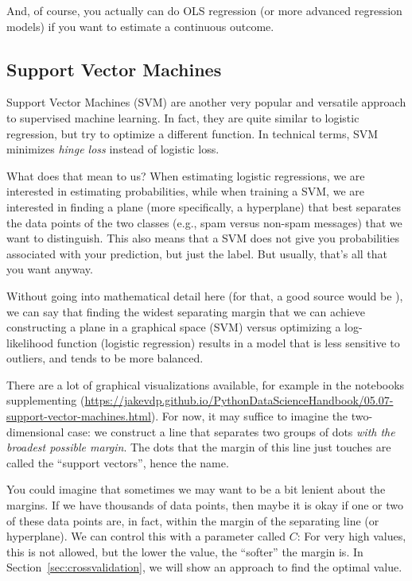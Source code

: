 And, of course, you actually can do OLS regression (or more advanced
regression models) if you want to estimate a continuous outcome.





\subsection{Support Vector Machines}
Support Vector Machines (SVM) are another very popular and versatile
approach to supervised machine learning.  In fact, they are quite
similar to logistic regression, but try to optimize a different
function. In technical terms, SVM minimizes \emph{hinge loss} instead
of logistic loss.

What does that mean to us? When estimating logistic regressions, we
are interested in estimating probabilities, while when training a
SVM, we are interested in finding a plane (more
specifically, a hyperplane) that best separates the data points of the
two classes (e.g., spam versus non-spam messages) that we want to
distinguish.  This also means that a SVM does not give you
probabilities associated with your prediction, but just the label.
But usually, that's all that you want anyway.

Without going into mathematical detail here (for that, a good source
would be \citet{kelleher2015fundamentals}), we can say that finding the
widest separating margin that we can achieve constructing a plane in a
graphical space (SVM) versus optimizing a log-likelihood function
(logistic regression) results in a model that is less sensitive to
outliers, and tends to be more balanced.

There are a lot of graphical visualizations available, for example in
the notebooks supplementing \cite{vanderplas2016python}
(\url{https://jakevdp.github.io/PythonDataScienceHandbook/05.07-support-vector-machines.html}).
For now, it may suffice to imagine the two-dimensional case: we
construct a line that separates two groups of dots \emph{with the
  broadest possible margin}. The dots that the margin of this line
just touches are called the ``support vectors'', hence the name.

You could imagine that sometimes we may want to be a bit lenient
about the margins. If we have thousands of data points, then maybe it
is okay if one or two of these data points are, in fact, within the
margin of the separating line (or hyperplane). We can control this with
a parameter called $C$: For very high values, this is not allowed, but
the lower the value, the ``softer'' the margin is.  In
Section~\ref{sec:crossvalidation}, we will show an approach to find
the optimal value.

